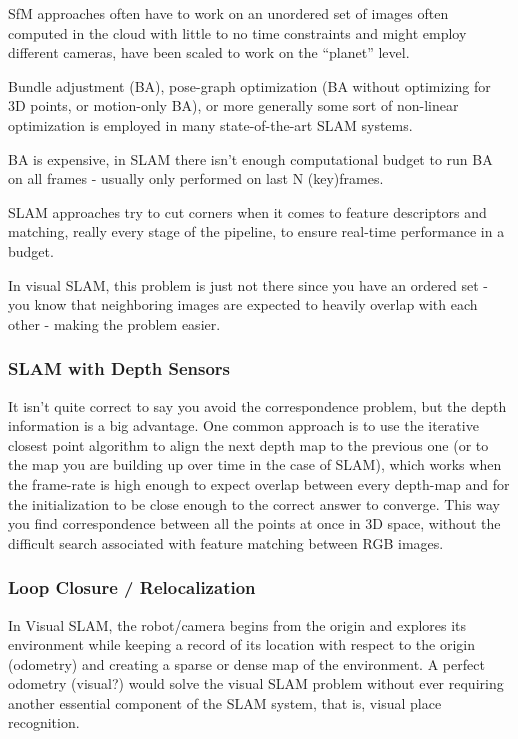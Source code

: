 \begin{enumerate}
SfM approaches often have to work on an unordered set of images often computed in the cloud with little to no time constraints and might employ different cameras, have been scaled to work on the “planet” level. 

Bundle adjustment (BA), pose-graph optimization (BA without optimizing for 3D points, or motion-only BA), or more generally some sort of non-linear optimization is employed in many state-of-the-art SLAM systems. 

BA is expensive, in SLAM there isn't enough computational budget to run BA on all frames - usually only performed on last N (key)frames. 

SLAM approaches try to cut corners when it comes to feature descriptors and matching, really every stage of the pipeline, to ensure real-time performance in a budget.

In visual SLAM, this problem is just not there since you have an ordered set - you know that neighboring images are expected to heavily overlap with each other - making the problem easier.

\subsubsection{SLAM with Depth Sensors}

It isn’t quite correct to say you avoid the correspondence problem, but the depth information is a big advantage. One common approach is to use the iterative closest point algorithm to align the next depth map to the previous one (or to the map you are building up over time in the case of SLAM), which works when the frame-rate is high enough to expect overlap between every depth-map and for the initialization to be close enough to the correct answer to converge. This way you find correspondence between all the points at once in 3D space, without the difficult search associated with feature matching between RGB images.

\subsubsection{Loop Closure / Relocalization}
In Visual SLAM, the robot/camera begins from the origin and explores its environment while keeping a record of its location with respect to the origin (odometry) and creating a sparse or dense map of the environment. A perfect odometry (visual?) would solve the visual SLAM problem without ever requiring another essential component of the SLAM system, that is, visual place recognition.


\end{enumerate}
